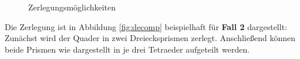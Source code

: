 \begin{figure}[ht]
\centering
{}
\qquad
{}
\qquad
{}
\caption{Zerlegungsmöglichkeiten}
\label{fig:cases}
\end{figure}

Die Zerlegung ist in Abbildung \ref{fig:decomp} beispielhaft für \textbf{Fall 2} dargestellt: Zunächst wird der Quader in zwei Dreiecksprismen zerlegt. Anschließend können beide Prismen wie dargestellt in je drei Tetraeder aufgeteilt werden.


